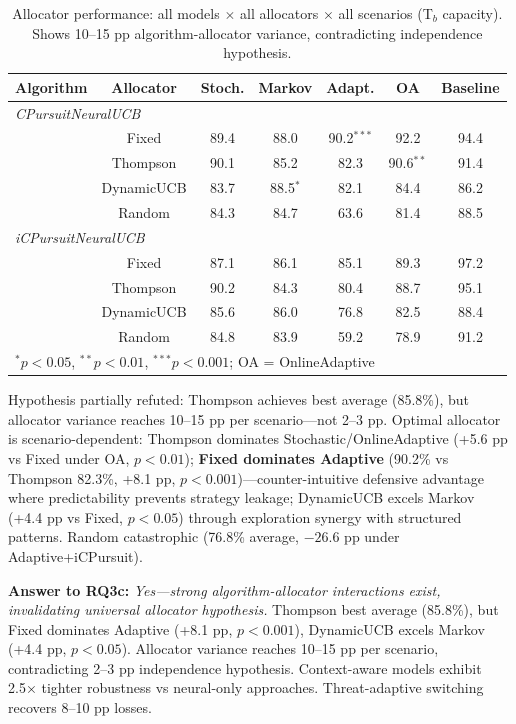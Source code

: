 \begin{table}[H]
\footnotesize
\centering
\caption{Allocator performance: all models $\times$ all allocators $\times$ all scenarios (T$_b$ capacity). Shows 10--15 pp algorithm-allocator variance, contradicting independence hypothesis.}
\begin{tabular}{lcccccc}
\toprule
\textbf{Algorithm} & \textbf{Allocator} & \textbf{Stoch.} & \textbf{Markov} & \textbf{Adapt.} & \textbf{OA} & \textbf{Baseline} \\
\midrule
\multicolumn{7}{l}{\textit{CPursuitNeuralUCB}} \\
 & Fixed & 89.4 & 88.0 & 90.2$^{***}$ & 92.2 & 94.4 \\
 & Thompson & 90.1 & 85.2 & 82.3 & 90.6$^{**}$ & 91.4 \\
 & DynamicUCB & 83.7 & 88.5$^{*}$ & 82.1 & 84.4 & 86.2 \\
 & Random & 84.3 & 84.7 & 63.6 & 81.4 & 88.5 \\
\midrule
\multicolumn{7}{l}{\textit{iCPursuitNeuralUCB}} \\
 & Fixed & 87.1 & 86.1 & 85.1 & 89.3 & 97.2 \\
 & Thompson & 90.2 & 84.3 & 80.4 & 88.7 & 95.1 \\
 & DynamicUCB & 85.6 & 86.0 & 76.8 & 82.5 & 88.4 \\
 & Random & 84.8 & 83.9 & 59.2 & 78.9 & 91.2 \\
\bottomrule
\multicolumn{7}{l}{\scriptsize $^{*}p<0.05$, $^{**}p<0.01$, $^{***}p<0.001$; OA = OnlineAdaptive} \\
\end{tabular}
\label{tab:rq3c_allocators}
\end{table}

Hypothesis partially refuted: Thompson achieves best average (85.8\%), but allocator variance reaches 10--15 pp per scenario—not 2--3 pp. Optimal allocator is scenario-dependent: Thompson dominates Stochastic/OnlineAdaptive (+5.6 pp vs Fixed under OA, $p<0.01$); \textbf{Fixed dominates Adaptive} (90.2\% vs Thompson 82.3\%, +8.1 pp, $p<0.001$)—counter-intuitive defensive advantage where predictability prevents strategy leakage; DynamicUCB excels Markov (+4.4 pp vs Fixed, $p<0.05$) through exploration synergy with structured patterns. Random catastrophic (76.8\% average, $-26.6$ pp under Adaptive+iCPursuit).

\noindent\textbf{Answer to RQ3c:} \textit{Yes—strong algorithm-allocator interactions exist, invalidating universal allocator hypothesis.} Thompson best average (85.8\%), but Fixed dominates Adaptive (+8.1 pp, $p<0.001$), DynamicUCB excels Markov (+4.4 pp, $p<0.05$). Allocator variance reaches 10--15 pp per scenario, contradicting 2--3 pp independence hypothesis. Context-aware models exhibit 2.5× tighter robustness vs neural-only approaches. Threat-adaptive switching recovers 8--10 pp losses.

